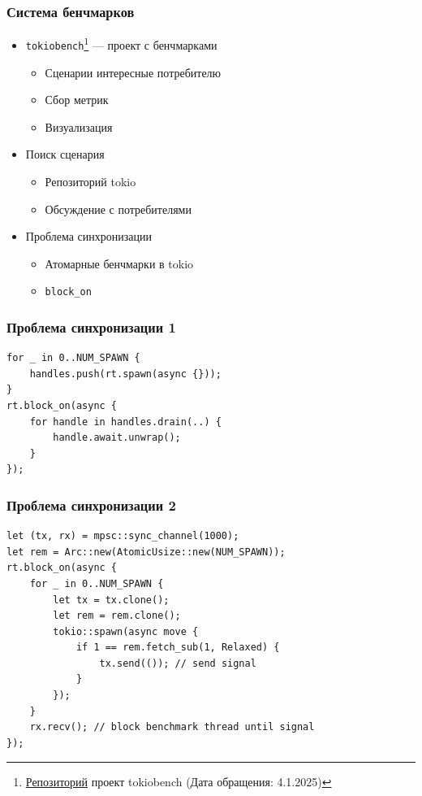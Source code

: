 \documentclass{beamer}
\begin{document}
\begin{frame}[fragile]
  \frametitle{Система бенчмарков}
  \begin{itemize}
    \item \verb|tokiobench|\footnote{\href{https://github.com/IgorErin/tokiobench}{Репозиторий} проект tokiobench (Дата обращения: 4.1.2025)} --- проект с бенчмарками
    \begin{itemize}
    \item Сценарии интересные потребителю
    \item Сбор метрик
    \item Визуализация
    \end{itemize}
    \item Поиск сценария
    \begin{itemize}
      \item Репозиторий tokio
      \item Обсуждение с потребителями
    \end{itemize}
    \item Проблема синхронизации
    \begin{itemize}
      \item Атомарные бенчмарки в tokio
      \item \verb|block_on|
    \end{itemize}
  \end{itemize}
\end{frame}


\begin{frame}[fragile]
  \frametitle{Проблема синхронизации 1}
    \begin{verbatim}
for _ in 0..NUM_SPAWN {
    handles.push(rt.spawn(async {}));
}
rt.block_on(async {
    for handle in handles.drain(..) {
        handle.await.unwrap();
    }
});
    \end{verbatim}

\end{frame}

\begin{frame}[fragile]
  \frametitle{Проблема синхронизации 2}
    \begin{verbatim}
let (tx, rx) = mpsc::sync_channel(1000);
let rem = Arc::new(AtomicUsize::new(NUM_SPAWN));
rt.block_on(async {
    for _ in 0..NUM_SPAWN {
        let tx = tx.clone();
        let rem = rem.clone();
        tokio::spawn(async move {
            if 1 == rem.fetch_sub(1, Relaxed) {
                tx.send(()); // send signal
            }
        });
    }
    rx.recv(); // block benchmark thread until signal
});
    \end{verbatim}
\end{frame}
\end{document}
